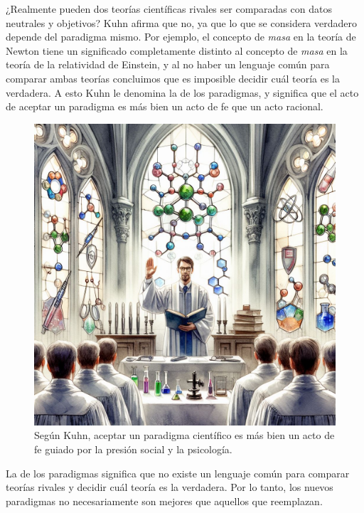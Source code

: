 ¿Realmente pueden dos teorías científicas rivales ser comparadas con datos
neutrales y objetivos?
Kuhn afirma que no, ya que lo que se considera verdadero depende del paradigma
mismo.
Por ejemplo, el concepto de \emph{masa} en la teoría de Newton tiene un
significado completamente distinto al concepto de \emph{masa} en la teoría de la
relatividad de Einstein, y al no haber un lenguaje común para comparar ambas
teorías concluimos que es imposible decidir cuál teoría es la verdadera.
A esto Kuhn le denomina la
 de los
paradigmas, y significa que el acto de aceptar un paradigma es más bien un acto
de fe que un acto racional.

\begin{figure}[ht]
    \centering
    \includegraphics[width=0.8\linewidth]{img/actodefe}
    \caption{Según Kuhn, aceptar un paradigma científico es más bien un acto de
        fe guiado por la presión social y la psicología.}
\end{figure}

\begin{remember}
    \label{rem:inconmensurabilidad}
    La  de los paradigmas significa que no
    existe un lenguaje común para comparar teorías rivales y decidir cuál teoría
    es la verdadera.
    Por lo tanto, los nuevos paradigmas no necesariamente son mejores que
    aquellos que reemplazan.
\end{remember}

